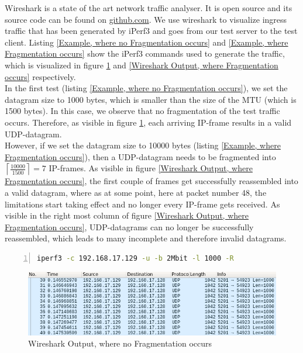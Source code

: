 Wireshark is a state of the art network traffic analyser. It is open source and its source code can be found on \href{https://github.com/wireshark/wireshark}{github.com}\cite{combs2019wireshark}. We use wireshark to visualize ingress traffic that has been generated by iPerf3 and goes from our test server to the test client. Listing \ref{Example, where no Fragmentation occurs} and \ref{Example, where Fragmentation occurs} show the iPerf3 commands used to generate the traffic, which is visualized in figure \ref{Wireshark Output, where no Fragmentation occurs} and \ref{Wireshark Output, where Fragmentation occurs} respectively.
\\
In the first test (listing \ref{Example, where no Fragmentation occurs}), we set the datagram size to 1000 bytes, which is smaller than the size of the \acs{MTU} (which is 1500 bytes). In this case, we observe that no fragmentation of the test traffic occurs. Therefore, as visible in figure \ref{Wireshark Output, where no Fragmentation occurs}, each arriving \acs{IP}-frame results in a valid \acs{UDP}-datagram.
\\
However, if we set the datagram size to 10000 bytes (listing \ref{Example, where Fragmentation occurs}), then a \acs{UDP}-datagram needs to be fragmented into $\left\lceil\frac{10000}{1500}\right\rceil = 7$ \acs{IP}-frames. As visible in figure \ref{Wireshark Output, where Fragmentation occurs}, the first couple of frames get successfully reassembled into a valid datagram, where as at some point, here at packet number 48, the limitations start taking effect and no longer every \acs{IP}-frame gets received. As visible in the right most column of figure \ref{Wireshark Output, where Fragmentation occurs}, \acs{UDP}-datagrams can no longer be successfully reassembled, which leads to many incomplete and therefore invalid datagrams.

\newpage

\begin{lstlisting}[language=sh, caption = {Example, where no Fragmentation occurs}, captionpos=b, numbers=left, frame=single, breaklines=true, breakatwhitespace=true, showstringspaces=false, label={Example, where no Fragmentation occurs}]
iperf3 -c 192.168.17.129 -u -b 2Mbit -l 1000 -R
\end{lstlisting}

\begin{figure}[h]
	\centering
	\includegraphics[width=\textwidth]{img/wireshark_l_1000_b_2Mbit.png}
	\caption{Wireshark Output, where no Fragmentation occurs}
	\label{Wireshark Output, where no Fragmentation occurs}
\end{figure}

